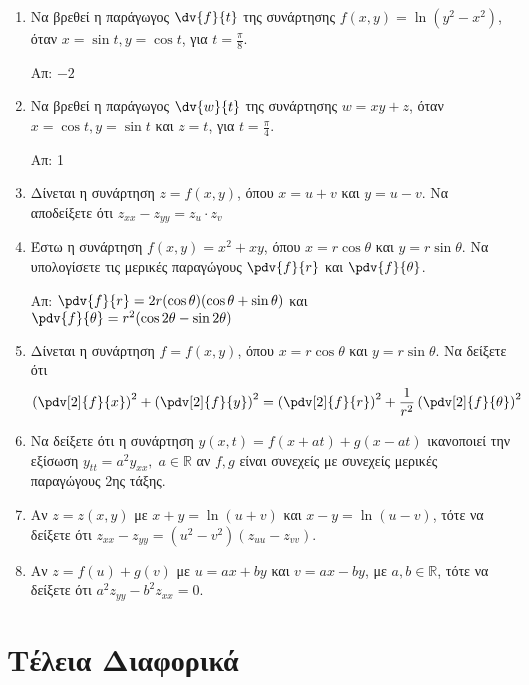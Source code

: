 \begin{enumerate}

  \item Να βρεθεί η παράγωγος $\dv{f}{t}$ της συνάρτησης 
    $f(x,y)=\ln(y^2-x^2)$, όταν $x=\sin t, y=\cos t$, για $t=\frac{\pi}{8}$.

    \hfill Απ: $-2$

  \item Να βρεθεί η παράγωγος $\dv{w}{t}$ της συνάρτησης 
    $ w = xy+z $, όταν $ x = \cos{t}, y = \sin{t}$ και $ z = t $, για 
    $ t = \frac{ \pi }{ 4 } $.

    \hfill Απ: 1

  \item Δίνεται η συνάρτηση $ z=f(x,y) $, όπου $ x=u+v $ και $ y = u-v $. 
    Να αποδείξετε ότι $ z_{xx}-z_{yy} = z_{u}\cdot z_{v} $ 

  \item Έστω η συνάρτηση  $ f(x,y) = x^{2} + xy $, όπου $ x=r \cos{\theta} $ και 
    $ y= r \sin{\theta} $. 
    Να υπολογίσετε τις μερικές παραγώγους $ \pdv{f}{r} $ και $ \pdv{f}{\theta} $.  

    \hfill Απ: 
      $ \pdv{f}{r} = 2r(\cos{\theta} )(\cos{\theta} + \sin{\theta}) $ \; και \; 
      $ \pdv{f}{\theta}=r^{2}(\cos{2\theta} - \sin{2 \theta}) $

  \item Δίνεται η συνάρτηση $ f = f(x,y) $, όπου $ x=r \cos{\theta} $ και 
    $ y= r \sin{\theta} $. Να δείξετε ότι 
    \[
      \left(\pdv[2]{f}{x}\right)^{2} + \left(\pdv[2]{f}{y}\right)^{2} = 
      \left(\pdv[2]{f}{r}\right)^{2} + \frac{1}{r^{2}} 
      \left(\pdv[2]{f}{\theta}\right)^{2}
    \] 

  \item Να δείξετε ότι η συνάρτηση $ y(x,t) = f(x+at)+g(x-at) $ ικανοποιεί την 
    εξίσωση $ y_{tt} = a^{2} y_{xx}, \; a \in \mathbb{R} $ αν $ f,g $ είναι συνεχείς 
    με συνεχείς μερικές παραγώγους 2ης τάξης.

  \item Αν $ z=z(x,y) $ με $ x+y= \ln{(u+v)} $ και $ x-y= \ln{(u-v)} $, τότε να δείξετε 
    ότι $ z_{xx}-z_{yy}=(u^{2}-v^{2}) (z_{uu} - z_{vv}) $.

  \item Αν $ z=f(u)+g(v) $ με $ u=ax+by $ και $ v=ax-by $, με $ a,b \in \mathbb{R} $, 
    τότε να δείξετε ότι $ a^{2} z_{yy} - b^{2} z_{xx} = 0 $.
\end{enumerate}


\section*{Τέλεια Διαφορικά}

